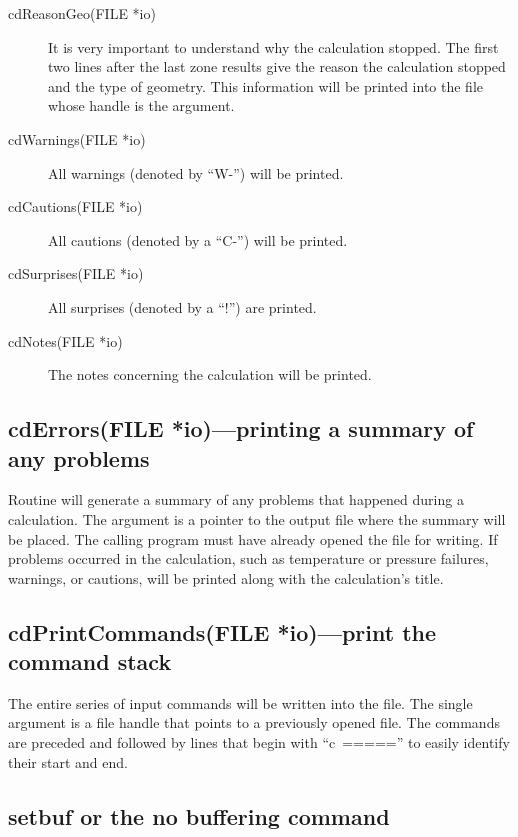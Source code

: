 \begin{description}
\item[cdReasonGeo(FILE *io)]  It is very important to understand why the calculation stopped.
The first two lines after the last zone results give the reason
the calculation stopped and the type of geometry.
This information will
be printed into the file whose handle is the argument.

\item[cdWarnings(FILE *io)]  All warnings (denoted by ``W-'') will be printed.

\item[cdCautions(FILE *io)]  All cautions (denoted by a ``C-'') will be printed.

\item[cdSurprises(FILE *io)]  All surprises (denoted by a ``!'') are printed.

\item[cdNotes(FILE *io)]  The notes concerning the calculation will be printed.
\end{description}

\subsection{cdErrors(FILE *io)---printing a summary of any problems}

Routine  will generate a summary
of any problems that happened during a calculation.
The argument is a pointer to the output
file where the summary will be placed.
The calling program must have already
opened the file for writing.
If problems occurred in the calculation, such
as temperature or pressure failures, warnings, or cautions,
will be printed
along with the calculation's title.

\subsection{cdPrintCommands(FILE *io)---print the command stack}

The entire series of input commands will be written into the file.  The
single argument is a file handle that points to a previously opened file.
The commands are preceded and followed by lines that begin with
``c~=====''
to easily identify their start and end.

\subsection{setbuf or the no buffering command}

